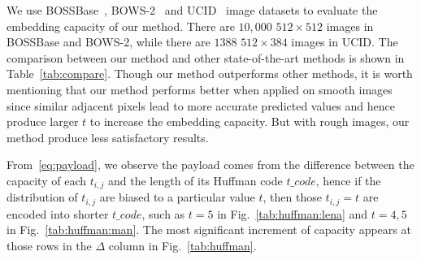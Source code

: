 \documentclass[journal]{IEEEtran}
\begin{document}
	
	
	 We use BOSSBase~\cite{Bas2011}, BOWS-2~\cite{Filler2010} and UCID~\cite{Schaefer2003} image datasets to evaluate the embedding capacity of our method. 
	 There are \(10,000\) \(512 \times 512\) images in BOSSBase and BOWS-2, while there are \(1388\) \(512 \times 384\) images in UCID.
	 The comparison between our method and other state-of-the-art methods is shown in Table~\ref{tab:compare}.
%	
%
	Though our method outperforms other methods, it is worth mentioning that our method performs better when applied on smooth images since similar adjacent pixels lead to more accurate predicted values and hence produce larger \(t\) to increase the embedding capacity. 
	But with rough images, our method produce less satisfactory results.
	
	From~\eqref{eq:payload}, we observe the payload comes from the difference between the capacity of each \(t_{i, j}\) and the length of its Huffman code \(t\_code\), hence if the distribution of \(t_{i, j}\) are biased to a particular value \(t\), then those \(t_{i, j} = t\) are encoded into shorter \(t\_code\), such as \(t = 5\) in Fig.~\ref{tab:huffman:lena} and \(t = 4, 5\) in Fig.~\ref{tab:huffman:man}.
	The most significant increment of capacity appears at those rows in the \(\Delta\) column in Fig.~\ref{tab:huffman}.
	
\end{document}
